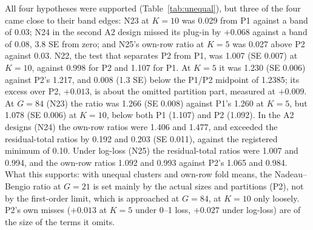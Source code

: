 \documentclass[11pt]{amsart}
\theoremstyle{plain}
\theoremstyle{definition}
\theoremstyle{remark}
\begin{document}
All four hypotheses were supported (Table~\ref{tab:unequal}), but three of the four came close to their band edges: N23 at $K=10$ was 0.029 from P1 against a band of 0.03; N24 in the second A2 design missed its plug-in by $+0.068$ against a band of 0.08, 3.8 SE from zero; and N25's own-row ratio at $K=5$ was 0.027 above P2 against 0.03. N22, the test that separates P2 from P1, was 1.007 (SE 0.007) at $K=10$, against 0.998 for P2 and 1.107 for P1. At $K=5$ it was 1.230 (SE 0.006) against P2's 1.217, and 0.008 (1.3 SE) below the P1/P2 midpoint of 1.2385; its excess over P2, $+0.013$, is about the omitted partition part, measured at $+0.009$. At $G=84$ (N23) the ratio was 1.266 (SE 0.008) against P1's 1.260 at $K=5$, but 1.078 (SE 0.006) at $K=10$, below both P1 (1.107) and P2 (1.092). In the A2 designs (N24) the own-row ratios were 1.406 and 1.477, and exceeded the residual-total ratios by 0.192 and 0.203 (SE 0.011), against the registered minimum of 0.10. Under log-loss (N25) the residual-total ratios were 1.007 and 0.994, and the own-row ratios 1.092 and 0.993 against P2's 1.065 and 0.984. What this supports: with unequal clusters and own-row fold means, the Nadeau--Bengio ratio at $G=21$ is set mainly by the actual sizes and partitions (P2), not by the first-order limit, which is approached at $G=84$, at $K=10$ only loosely. P2's own misses ($+0.013$ at $K=5$ under 0--1 loss, $+0.027$ under log-loss) are of the size of the terms it omits.
\end{document}
